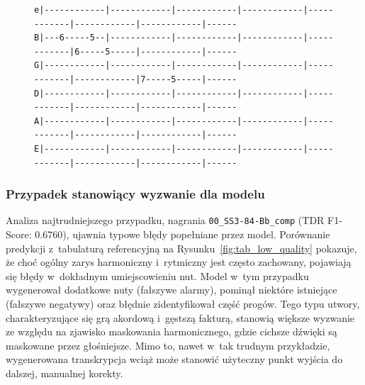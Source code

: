 \begin{figure}[H]
{\begin{verbatim}
e|------------|------------|------------|------------|------------|------------|------------|------
B|---6-----5--|------------|------------|------------|------------|6-----5-----|------------|------
G|------------|------------|------------|------------|------------|------------|7-----5-----|------
D|------------|------------|------------|------------|------------|------------|------------|------
A|------------|------------|------------|------------|------------|------------|------------|------
E|------------|------------|------------|------------|------------|------------|------------|------
\end{verbatim}
    } 
\end{figure}

\subsubsection{Przypadek stanowiący wyzwanie dla modelu}
\label{sssec:analiza_najgorszy}

Analiza najtrudniejszego przypadku, nagrania \texttt{00\_SS3-84-Bb\_comp} (TDR F1-Score: 0.6760), ujawnia typowe błędy popełniane przez model. Porównanie predykcji z~tabulaturą referencyjną na Rysunku~\ref{fig:tab_low_quality} pokazuje, że choć ogólny zarys harmoniczny i~rytmiczny jest często zachowany, pojawiają się błędy w~dokładnym umiejscowieniu nut. Model w~tym przypadku wygenerował dodatkowe nuty (fałszywe alarmy), pominął niektóre istniejące (fałszywe negatywy) oraz błędnie zidentyfikował część progów. Tego typu utwory, charakteryzujące się grą akordową i~gęstszą fakturą, stanowią większe wyzwanie ze względu na zjawisko maskowania harmonicznego, gdzie cichsze dźwięki są maskowane przez głośniejsze. Mimo to, nawet w~tak trudnym przykładzie, wygenerowana transkrypcja wciąż może stanowić użyteczny punkt wyjścia do dalszej, manualnej korekty.

